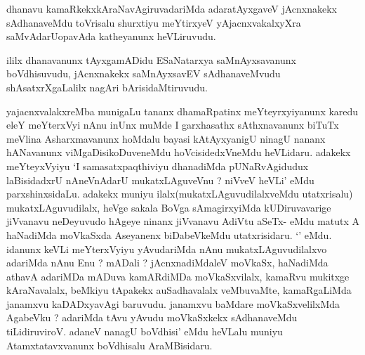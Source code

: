 \begin{center}


\end{center}

\begin{artha}

dhanavu kamaRkekxkAraNavAgiruvadariMda adaratAyxgaveV jAcnxnakekx
sAdhanaveMdu toVrisalu shurxtiyu meYtirxyeV yAjacnxvakalxyXra
saMvAdarUopavAda katheyanunx heVLiruvudu.

ililx dhanavanunx tAyxgamADidu ESaNatarxya saMnAyxsavanunx
boVdhisuvudu, jAcnxnakekx saMnAyxsavEV sAdhanaveMvudu
shAsatxrXgaLalilx nagAri bArisidaMtiruvudu.
\end{artha}

\begin{center}


\end{center}


\begin{artha}
yajacnxvalakxreMba munigaLu tananx dhamaRpatinx meYteyrxyiyanunx
karedu eleY meYterxVyi nAnu inUnx muMde I garxhasathx sAthxnavanunx
biTuTx meVlina Asharxmavanunx hoMdalu bayasi kAtAyxyanigU ninagU
nananx hANavanunx viMgaDisikoDuveneMdu hoVcisidedxVneMdu
heVLidaru. adakekx meYteyxVyiyu `I samasatxpaqthiviyu dhanadiMda
pUNaRvAgidudux laBisidadxrU nAneVnAdarU mukatxLAguveVnu ? niVveV
heVLi' eMdu parxshinxsidaLu. adakekx muniyu
ilalx(mukatxLAguvudilalxveMdu utatxrisalu) mukatxLAguvudilalx, heVge
sakala BoVga sAmagirxyiMda kUDiruvavarige jiVvanavu neDeyuvudo hAgeye
ninanx jiVvanavu AdiVtu aSeTx- eMdu matutx A haNadiMda moVkaSxda
Aseyanenx biDabeVkeMdu utatxrisidaru. `\stext' eMdu. idanunx keVLi
meYterxVyiyu yAvudariMda nAnu mukatxLAguvudilalxvo adariMda nAnu Enu ?
mADali ? jAcnxnadiMdaleV moVkaSx, haNadiMda athavA adariMDa mADuva
kamARdiMDa moVkaSxvilalx, kamaRvu mukitxge kAraNavalalx, beMkiyu
tApakekx auSadhavalalx veMbuvaMte, kamaRgaLiMda janamxvu kaDADxyavAgi
baruvudu. janamxvu baMdare moVkaSxvelilxMda AgabeVku ? adariMda tAvu
yAvudu moVkaSxkekx sAdhanaveMdu tiLidiruviroV. adaneV nanagU boVdhisi'
eMdu heVLalu muniyu Atamxtatavxvanunx boVdhisalu AraMBisidaru.
\end{artha}


